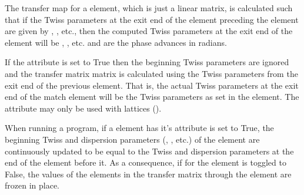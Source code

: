 {{
The transfer map for a  element, which is just a
linear matrix, is calculated such that if the Twiss parameters at the
exit end of the element preceding the  element are given by
, , etc., then the computed Twiss parameters
at the exit end of the  element will be ,
, etc.  and  are the phase advances
in radians.

If the  attribute is set to True then the beginning
Twiss parameters are ignored and the transfer matrix matrix is
calculated using the Twiss parameters from the exit end of the
previous element.  That is, the actual Twiss parameters at the exit
end of the match element will be the Twiss parameters as set in the
element. The  attribute may only be used with
 lattices (). 

When running a program, if a  element has it's
 attribute is set to True, the beginning Twiss and
dispersion parameters (, , etc.)  of the
 element are continuously updated to be equal to the Twiss
and dispersion parameters at the end of the element before it. As
a consequence, if  for the  element is toggled
to False, the values of the elements in the transfer matrix through
the  element are frozen in place.

}}
